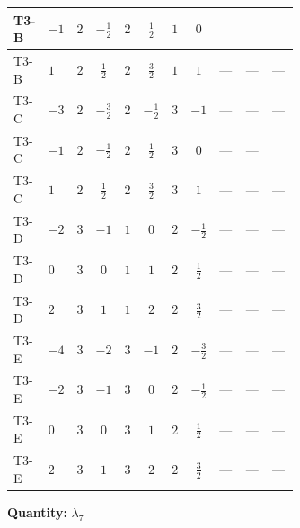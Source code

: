 \documentclass[8pt]{article}
\begin{document}
\begin{landscape}
\begin{longtable}{@{}llcccccc >{\raggedright\arraybackslash}p{0.21\linewidth} >{\raggedright\arraybackslash}p{0.21\linewidth} >{\raggedright\arraybackslash}p{0.21\linewidth}@{}}
\midrule
T3-B & $-1$ & $2$ & $-\frac{1}{2}$ & $2$ & $\frac{1}{2}$ & $1$ & $0$ & \scriptsize\adjustbox{max width=\linewidth}{$\begin{gathered} {\lambda_{7}} (2 T_{\nu}^{(1)}+6 \operatorname{Tr}\!\left({Y_d}\,\left({Y_d}\right)^{\dagger}\right)+2 \operatorname{Tr}\!\left({Y_e}\,\left({Y_e}\right)^{\dagger}\right)+6 \operatorname{Tr}\!\left({Y_u}\,\left({Y_u}\right)^{\dagger}\right))\end{gathered}$} & \scriptsize\adjustbox{max width=\linewidth}{$\begin{gathered} +\left({\lambda_5}\right)^{*} \operatorname{Tr}\!\left({y_2}\,\left({y_1}\right)^{\dagger}\right)\end{gathered}$} & \scriptsize\adjustbox{max width=\linewidth}{$\begin{gathered} -2 {\lambda_{H H^\dagger S_1^\dagger S_2^\dagger}^{\rm Cross}} \left({\lambda_5}\right)^{*}\end{gathered}$} \\
\midrule
T3-B & $1$ & $2$ & $\frac{1}{2}$ & $2$ & $\frac{3}{2}$ & $1$ & $1$ & --- & --- & --- \\
\midrule
T3-C & $-3$ & $2$ & $-\frac{3}{2}$ & $2$ & $-\frac{1}{2}$ & $3$ & $-1$ & --- & --- & --- \\
\midrule
T3-C & $-1$ & $2$ & $-\frac{1}{2}$ & $2$ & $\frac{1}{2}$ & $3$ & $0$ & --- & --- & \scriptsize\adjustbox{max width=\linewidth}{$\begin{gathered} -2 {\lambda_{H H^\dagger S_1^\dagger S_2^\dagger}^{\rm Cross}} \left({\lambda_5}\right)^{*}\end{gathered}$} \\
\midrule
T3-C & $1$ & $2$ & $\frac{1}{2}$ & $2$ & $\frac{3}{2}$ & $3$ & $1$ & --- & --- & --- \\
\midrule
T3-D & $-2$ & $3$ & $-1$ & $1$ & $0$ & $2$ & $-\frac{1}{2}$ & --- & --- & --- \\
\midrule
T3-D & $0$ & $3$ & $0$ & $1$ & $1$ & $2$ & $\frac{1}{2}$ & --- & --- & --- \\
\midrule
T3-D & $2$ & $3$ & $1$ & $1$ & $2$ & $2$ & $\frac{3}{2}$ & --- & --- & --- \\
\midrule
T3-E & $-4$ & $3$ & $-2$ & $3$ & $-1$ & $2$ & $-\frac{3}{2}$ & --- & --- & --- \\
\midrule
T3-E & $-2$ & $3$ & $-1$ & $3$ & $0$ & $2$ & $-\frac{1}{2}$ & --- & --- & --- \\
\midrule
T3-E & $0$ & $3$ & $0$ & $3$ & $1$ & $2$ & $\frac{1}{2}$ & --- & --- & --- \\
\midrule
T3-E & $2$ & $3$ & $1$ & $3$ & $2$ & $2$ & $\frac{3}{2}$ & --- & --- & --- \\
\midrule
\bottomrule
\end{longtable}
\clearpage
\noindent\textbf{Quantity: }$\lambda_{7}$\par\smallskip

\end{landscape}
\end{document}

